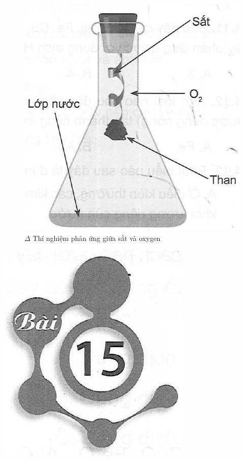 \documentclass[10pt]{article}
\begin{document}
\begin{figure}[h]
\begin{center}
  \includegraphics[width=\textwidth]{2025_10_23_de6f5713836e4e91b3c8g-092}
\captionsetup{labelformat=empty}
\caption{$\Delta$ Thí nghiệm phản ứng giữa sắt và oxygen}
\end{center}
\end{figure}

\begin{center}
\includegraphics[max width=\textwidth]{2025_10_23_de6f5713836e4e91b3c8g-093}
\end{center}
\end{document}
